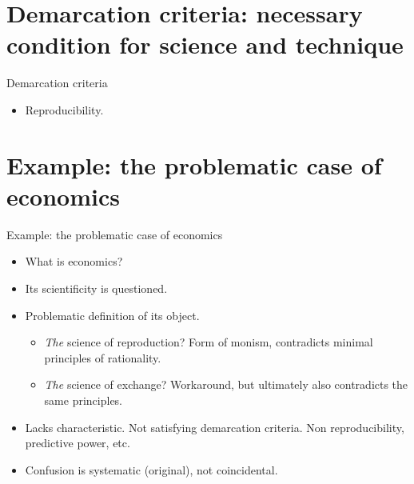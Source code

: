 \documentclass{beamer}
\begin{document}
\section{Demarcation criteria: necessary condition for science and technique}

\begin{frame}{Demarcation criteria}{}
  \begin{itemize}
  \item Reproducibility.
  \end{itemize}
\end{frame}

\section{Example: the problematic case of economics}

\begin{frame}{Example: the problematic case of economics}

  \begin{itemize}
  \item What is economics?
  \item Its scientificity is questioned.
   \item Problematic definition of its object.
   	\begin{itemize}
   	\item \textit{The} science of reproduction? Form of monism, contradicts minimal principles of rationality.
   	\item \textit{The} science of exchange? Workaround, but ultimately also contradicts the same principles.
   	\end{itemize}
   \item Lacks characteristic. Not satisfying demarcation criteria. Non reproducibility, predictive power, etc.
   \item Confusion is systematic (original), not coincidental.
  \end{itemize}
\end{frame}
\end{document}

